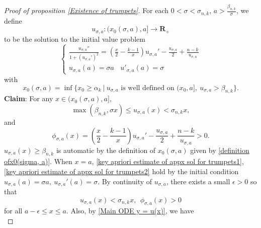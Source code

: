 \documentclass[pdflatex,sn-mathphys-num]{sn-jnl}
\begin{document}
\begin{proof}[Proof of proposition \ref{Existence of trumpets}]
For each $0 < \sigma < \sigma_{n,k}$, $a > \frac{\beta_{n,k}}{\sigma}$, we define 
    \begin{equation}
        u_{\sigma, a} : (x_{0}(\sigma, a), a] \to \mathbf{R}_+
    \end{equation}
    to be the solution to the initial value problem
    \begin{equation}
        \begin{cases}
            \frac{u_{\sigma, a}''}{1 + (u_{\sigma, a}')^2} = (\frac{x}{2} - \frac{k-1}{x})u_{\sigma, a}' - \frac{u_{\sigma, a}}{2} + \frac{n - k}{u_{\sigma, a}} \\
            u_{\sigma, a}(a) = \sigma a \ \ \ \ u'_{\sigma, a}(a) = \sigma
        \end{cases}
    \end{equation}
    with 
    \begin{equation}\label{definition ofx0(sigma, a)}
      x_{0}(\sigma, a) = \inf\{x_0 \geq \alpha_k\ | \ u_{\sigma, a} \text{ is well defined on }(x_0, a], \ u_{\sigma, a} > \beta_{n,k} \}. 
    \end{equation}
 \textbf{Claim}: For any $x \in (x_0(\sigma, a), a]$,
\begin{equation}\label{key apriori estimate of appx sol for trumpets1}
       \max(\beta_{n,k}, \sigma x) \leq u_{\sigma, a}(x) < \sigma_{n,k}x,   
    \end{equation}
    and
    \begin{equation}\label{key apriori estimate of appx sol for trumpets2}
        \phi_{\sigma, a}(x) = (\frac{x}{2} - \frac{k-1}{x})u_{\sigma, a}' - \frac{u_{\sigma, a}}{2} + \frac{n - k}{u_{\sigma, a}} > 0.
    \end{equation}
    $u_{\sigma, a}(x) \geq \beta_{n,k}$ is automatic by the definition of $x_0(\sigma, a)$ given by \eqref{definition ofx0(sigma, a)}. When $x = a$, \eqref{key apriori estimate of appx sol for trumpets1}, \eqref{key apriori estimate of appx sol for trumpets2} hold by the initial condition $u_{\sigma, a}(a) = \sigma a, \ u_{\sigma, a}'(a)= \sigma$. By continuity of $u_{\sigma, a}$, there exists a small $\epsilon > 0$ so that  
   \begin{equation}
       u_{\sigma, a}(x) < \sigma_{n,k}x, \ \ \phi_{\sigma, a}(x) > 0
   \end{equation}
    for all $a - \epsilon \leq x \leq a$. Also, by \eqref{Main ODE y = u(x)}, we have
    \begin{equation}\label{relationship between two derivative and phi}

\end{equation}
\end{proof}
\end{document}
